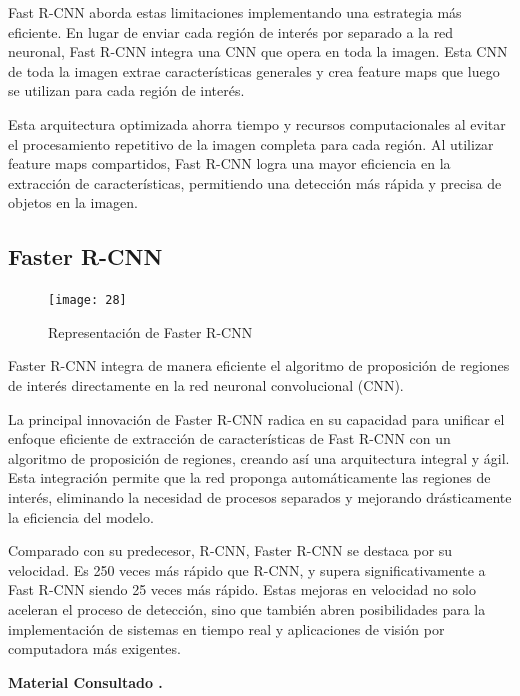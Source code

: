     Fast R-CNN aborda estas limitaciones implementando una estrategia más eficiente. En lugar de enviar cada región de interés por separado a la red neuronal, Fast R-CNN integra una CNN que opera en toda la imagen. Esta CNN de toda la imagen extrae características generales y crea feature maps que luego se utilizan para cada región de interés.
    
    Esta arquitectura optimizada ahorra tiempo y recursos computacionales al evitar el procesamiento repetitivo de la imagen completa para cada región. Al utilizar feature maps compartidos, Fast R-CNN logra una mayor eficiencia en la extracción de características, permitiendo una detección más rápida y precisa de objetos en la imagen.
    \pagebreak

	\subsection{Faster R-CNN}
	
	\begin{figure} 
		\centering
		\texttt{[image: 28]}
		\caption{Representación de Faster R-CNN}
	\end{figure}
	
	Faster R-CNN integra de manera eficiente el algoritmo de proposición de regiones de interés directamente en la red neuronal convolucional (CNN).
	
	La principal innovación de Faster R-CNN radica en su capacidad para unificar el enfoque eficiente de extracción de características de Fast R-CNN con un algoritmo de proposición de regiones, creando así una arquitectura integral y ágil. Esta integración permite que la red proponga automáticamente las regiones de interés, eliminando la necesidad de procesos separados y mejorando drásticamente la eficiencia del modelo.


	Comparado con su predecesor, R-CNN, Faster R-CNN se destaca por su velocidad. Es 250 veces más rápido que R-CNN, y supera significativamente a Fast R-CNN siendo 25 veces más rápido. Estas mejoras en velocidad no solo aceleran el proceso de detección, sino que también abren posibilidades para la implementación de sistemas en tiempo real y aplicaciones de visión por computadora más exigentes.

        \begin{flushright}
        \textbf{Material Consultado \cite{cnn}.}
    \end{flushright}
    
\newpage

